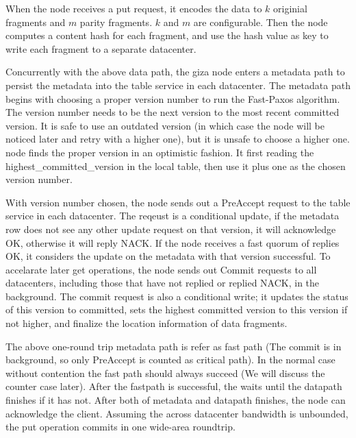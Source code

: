 When the {\name} node receives a put request, it encodes the data to $k$ originial fragments
and $m$ parity fragments. $k$ and $m$ are configurable. Then the node computes a content
hash for each fragment, and use the hash value as key to write each fragment to a separate
datacenter.


Concurrently with the above data path, the giza node enters a metadata path to persist
the metadata into the table service in each datacenter. The metadata path begins with
choosing a proper version number to run the Fast-Paxos algorithm. The version number needs
to be the next version to the most recent committed version. It is safe to use an outdated
version (in which case the {\name} node will be noticed later and retry with a higher one),
but it is unsafe to choose a higher one. {\name} node finds the proper version in an
optimistic fashion. It first reading the highest\_committed\_version in the local table,
then use it plus one as the chosen version number.

With version number chosen, the {\name} node sends out a PreAccept request to the table
service in each datacenter. The reqeust is a conditional update, if the metadata row
does not see any other update request on that version, it will acknowledge OK, otherwise
it will reply NACK. If the {\name} node receives a fast quorum of replies OK, it considers
the update on the metadata with that version successful. To accelarate later get operations,
the {\name} node sends out Commit requests to all datacenters, including those that
have not replied or replied NACK, in the background. The commit request is also a conditional
write; it updates the status of this version to committed, sets the highest committed
version to this version if not higher, and finalize the location information of data
fragments.

The above one-round trip metadata path is refer as fast path (The commit is in background,
so only PreAccept is counted as critical path). In the normal case without contention
the fast path should always succeed (We will discuss the counter case later). After the
fastpath is successful, the {\name} waits until the datapath finishes if it has not.
After both of metadata and datapath finishes, the {\name} node can acknowledge the client.
Assuming the across datacenter bandwidth is unbounded, the {\name} put operation commits
in one wide-area roundtrip.

